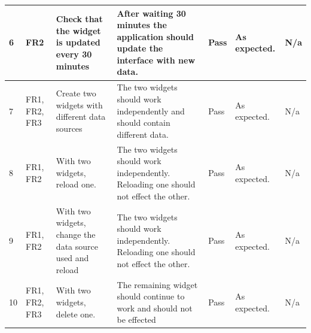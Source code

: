 \documentclass[paper=a4, fontsize=11pt]{scrartcl}	%
\numberwithin{equation}{section}															%
\numberwithin{figure}{section}																%
\numberwithin{table}{section}
\begin{document}
\begin{landscape}
\begin{longtable}{|l|p{2cm}|p{5cm}|p{7cm}|l|p{3cm}|p{1.5cm}|}
6           & FR2                             & Check that the widget is updated every 30 minutes        & After waiting 30 minutes the application should update the interface with new data.                                                              & Pass               & As expected.            & N/a               \\ \hline
7           & FR1, FR2, FR3                   & Create two widgets with different data sources           & The two widgets should work independently and should contain different data.                                                                     & Pass               & As expected.            & N/a               \\ \hline
8           & FR1, FR2                        & With two widgets, reload one.                            & The two widgets should work independently. Reloading one should not effect the other.                                                            & Pass               & As expected.            & N/a               \\ \hline
9           & FR1, FR2                        & With two widgets, change the data source used and reload & The two widgets should work independently. Reloading one should not effect the other.                                                            & Pass               & As expected.            & N/a               \\ \hline
10          & FR1, FR2, FR3                   & With two widgets, delete one.                            & The remaining widget should continue to work and should not be effected                                                                          & Pass               & As expected.            & N/a               \\ \hline

                                                                                                                                                                                                         
\end{longtable}


\end{landscape}

\clearpage


\end{document}
